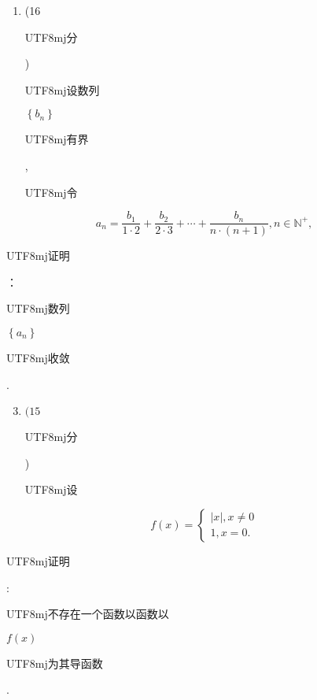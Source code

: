 \documentclass[10pt]{article}
\begin{document}
\begin{enumerate}
  \item (16 \begin{CJK}{UTF8}{mj}分\end{CJK}) \begin{CJK}{UTF8}{mj}设数列\end{CJK} $\left\{b_{n}\right\}$ \begin{CJK}{UTF8}{mj}有界\end{CJK}, \begin{CJK}{UTF8}{mj}令\end{CJK}
\end{enumerate}
$$
a_{n}=\frac{b_{1}}{1 \cdot 2}+\frac{b_{2}}{2 \cdot 3}+\cdots+\frac{b_{n}}{n \cdot(n+1)}, n \in \mathbb{N}^{+},
$$
\begin{CJK}{UTF8}{mj}证明\end{CJK}：\begin{CJK}{UTF8}{mj}数列\end{CJK} $\left\{a_{n}\right\}$ \begin{CJK}{UTF8}{mj}收敛\end{CJK}.

\begin{enumerate}
  \setcounter{enumi}{2}
  \item $(15$ \begin{CJK}{UTF8}{mj}分\end{CJK})\begin{CJK}{UTF8}{mj}设\end{CJK}
\end{enumerate}
$$
f(x)=\left\{\begin{array}{l}
|x|, x \neq 0 \\
1, x=0 .
\end{array}\right.
$$
\begin{CJK}{UTF8}{mj}证明\end{CJK}: \begin{CJK}{UTF8}{mj}不存在一个函数以函数以\end{CJK} $f(x)$ \begin{CJK}{UTF8}{mj}为其导函数\end{CJK}.
\end{document}
